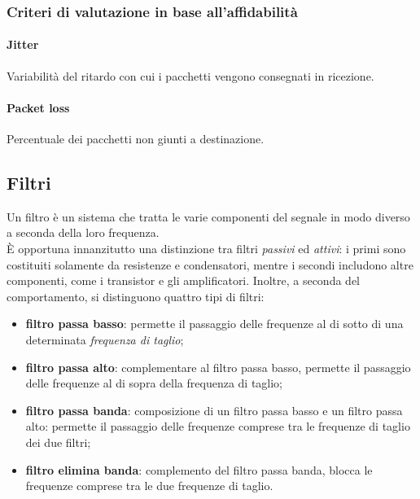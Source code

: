 \documentclass[a4paper,11pt]{article}
\def\sub#1{\subsection{#1}\label{#1}}
\def\para#1{\paragraph{#1}\label{#1}}
\begin{document}
\subsubsection{Criteri di valutazione in base all'affidabilità}
\para{Jitter}Variabilità del ritardo con cui i pacchetti vengono consegnati in ricezione.
\para{Packet loss}Percentuale dei pacchetti non giunti a destinazione.

\sub{Filtri}
Un filtro è un sistema che tratta le varie componenti del segnale in modo diverso a seconda della loro frequenza.
\\È opportuna innanzitutto una distinzione tra filtri \textit{passivi} ed \textit{attivi}: i primi sono costituiti solamente da resistenze e condensatori, mentre i secondi includono altre componenti, come i transistor e gli amplificatori. Inoltre, a seconda del comportamento, si distinguono quattro tipi di filtri:
\begin{itemize}
\item \textbf{filtro passa basso}: permette il passaggio delle frequenze al di sotto di una determinata \textit{frequenza di taglio};
\item \textbf{filtro passa alto}: complementare al filtro passa basso, permette il passaggio delle frequenze al di sopra della frequenza di taglio;
\item \textbf{filtro passa banda}: composizione di un filtro passa basso e un filtro passa alto: permette il passaggio delle frequenze comprese tra le frequenze di taglio dei due filtri;
\item \textbf{filtro elimina banda}: complemento del filtro passa banda, blocca le frequenze comprese tra le due frequenze di taglio.
\end{itemize}
\end{document}
